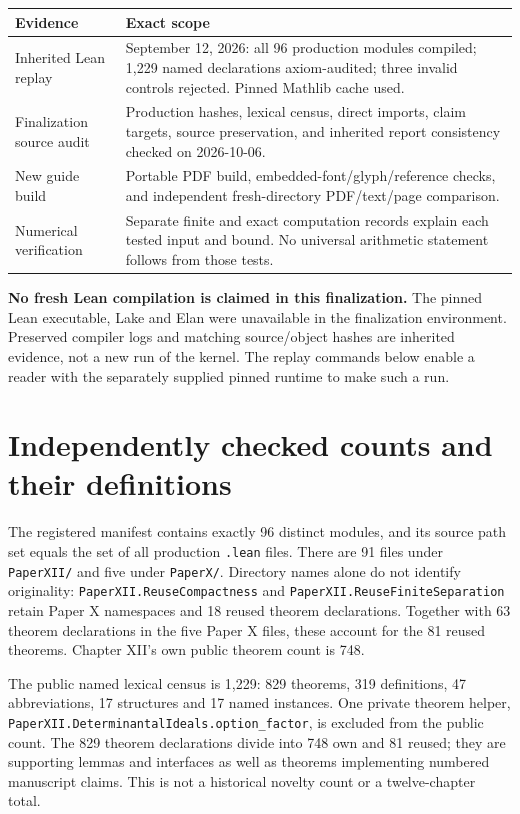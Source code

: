 \documentclass[11pt]{article}
\newcommand{\code}[1]{\nolinkurl{#1}}
\newcommand{\module}[1]{\nolinkurl{PaperXII.#1}}
\begin{document}
\begin{center}
\begin{tabular}{p{}p{}}
\toprule Evidence & Exact scope\\\midrule
Inherited Lean replay & September 12, 2026: all 96 production modules compiled; 1,229 named declarations axiom-audited; three invalid controls rejected. Pinned Mathlib cache used.\\
Finalization source audit & Production hashes, lexical census, direct imports, claim targets, source preservation, and inherited report consistency checked on 2026-10-06.\\
New guide build & Portable PDF build, embedded-font/glyph/reference checks, and independent fresh-directory PDF/text/page comparison.\\
Numerical verification & Separate finite and exact computation records explain each tested input and bound. No universal arithmetic statement follows from those tests.\\
\bottomrule
\end{tabular}
\end{center}

\textbf{No fresh Lean compilation is claimed in this finalization.} The pinned Lean executable, Lake and Elan were unavailable in the finalization environment. Preserved compiler logs and matching source/object hashes are inherited evidence, not a new run of the kernel. The replay commands below enable a reader with the separately supplied pinned runtime to make such a run.

\section{Independently checked counts and their definitions}
The registered manifest contains exactly 96 distinct modules, and its source path set equals the set of all production \code{.lean} files. There are 91 files under \code{PaperXII/} and five under \code{PaperX/}. Directory names alone do not identify originality: \module{ReuseCompactness} and \module{ReuseFiniteSeparation} retain Paper X namespaces and 18 reused theorem declarations. Together with 63 theorem declarations in the five Paper X files, these account for the 81 reused theorems. Chapter XII's own public theorem count is 748.

The public named lexical census is 1,229: 829 theorems, 319 definitions, 47 abbreviations, 17 structures and 17 named instances. One private theorem helper, \code{PaperXII.DeterminantalIdeals.option_factor}, is excluded from the public count. The 829 theorem declarations divide into 748 own and 81 reused; they are supporting lemmas and interfaces as well as theorems implementing numbered manuscript claims. This is not a historical novelty count or a twelve-chapter total.
\end{document}
